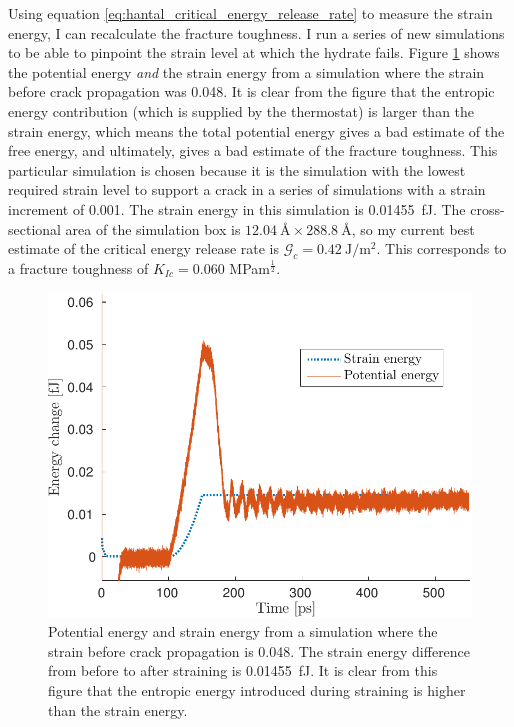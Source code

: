 Using equation \ref{eq:hantal_critical_energy_release_rate} to measure the strain energy, I can recalculate the fracture toughness. I run a series of new simulations to be able to pinpoint the strain level at which the hydrate fails. Figure \ref{fig:pot_strain_eng_l1} shows the potential energy \emph{and} the strain energy from a simulation where the strain before crack propagation was 0.048. It is clear from the figure that the entropic energy contribution (which is supplied by the thermostat) is larger than the strain energy, which means the total potential energy gives a bad estimate of the free energy, and ultimately, gives a bad estimate of the fracture toughness. This particular simulation is chosen because it is the simulation with the lowest required strain level to support a crack in a series of simulations with a strain increment of 0.001. The strain energy in this simulation is \SI{0.01455}{\femto\joule}. The cross-sectional area of the simulation box is $\SI{12.04}{\angstrom} \times \SI{288.8}{\angstrom}$, so my current best estimate of the critical energy release rate is $\mathcal{G}_c = \SI{0.42}{\joule\per\meter\squared}$. This corresponds to a fracture toughness of $K_{Ic} = 0.060$ MPam$^\frac{1}{2}$.



\begin{figure}
\centering
\includegraphics[width=12cm]{../figures/thesis/pot_strain_eng_24_24_1.pdf}
\caption{Potential energy and strain energy from a simulation where the strain before crack propagation is 0.048. The strain energy difference from before to after straining is \SI{0.01455}{\femto\joule}. It is clear from this figure that the entropic energy introduced during straining is higher than the strain energy.}
\label{fig:pot_strain_eng_l1}
\end{figure} 

